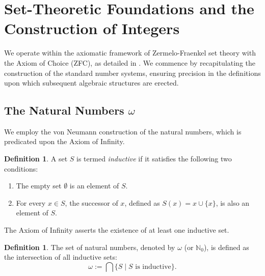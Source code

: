 \documentclass[11pt, a4paper]{article}
\theoremstyle{plain}
\theoremstyle{definition}
\newtheorem{definition}[theorem]{Definition}
\numberwithin{equation}{section}
\newcommand{\N}{\mathbb{N}}
\begin{document}
\tableofcontents

\section{Set-Theoretic Foundations and the Construction of Integers}

We operate within the axiomatic framework of Zermelo-Fraenkel set theory with the Axiom of Choice (ZFC), as detailed in \cite{JechSetTheory}. We commence by recapitulating the construction of the standard number systems, ensuring precision in the definitions upon which subsequent algebraic structures are erected.

\subsection{The Natural Numbers $\omega$}

We employ the von Neumann construction of the natural numbers, which is predicated upon the Axiom of Infinity.

\begin{definition}
A set $S$ is termed \emph{inductive} if it satisfies the following two conditions:
\begin{enumerate}
    \item The empty set $\emptyset$ is an element of $S$.
    \item For every $x \in S$, the successor of $x$, defined as $S(x) = x \cup \{x\}$, is also an element of $S$.
\end{enumerate}
\end{definition}

The Axiom of Infinity asserts the existence of at least one inductive set.

\begin{definition}
The set of natural numbers, denoted by $\omega$ (or $\N_0$), is defined as the intersection of all inductive sets:
\begin{equation}
    \omega := \bigcap \{S \mid S \text{ is inductive}\}.
\end{equation}
\end{definition}
\end{document}
